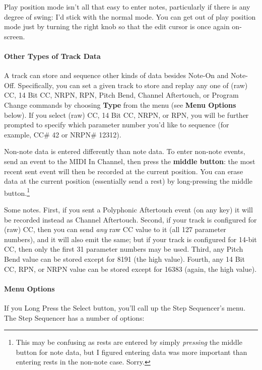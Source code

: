 \documentclass{article}
\begin{document}
Play position mode isn't all that easy to enter notes, particularly if there is any degree of swing: I'd stick with the normal mode.  You can get out of play position mode just by turning the right knob so that the edit cursor is once again on-screen.

\paragraph{Other Types of Track Data}  A track can store and sequence other kinds of data besides Note-On and Note-Off.  Specifically, you can set a given track to store and replay any one of (raw) CC, 14 Bit CC, NRPN, RPN, Pitch Bend, Channel Aftertouch, or Program Change commands by choosing {\bf Type} from the menu (see {\bf Menu Options} below).  If you select (raw) CC, 14 Bit CC, NRPN, or RPN, you will be further prompted to specify which parameter number you'd like to sequence (for example, CC\# 42 or NRPN\# 12312).

Non-note data is entered differently than note data.  To enter non-note events, send an event to the MIDI In Channel, then press the {\bf middle button}: the most recent sent event will then be recorded at the current position.  You can erase data at the current position (essentially send a rest) by long-pressing the middle button.\footnote{This may be confusing as rests are entered by simply {\it pressing} the middle button for note data, but I figured entering data was more important than entering rests in the non-note case.  Sorry.}

Some notes.  First, if you sent a Polyphonic Aftertouch event (on any key) it will be recorded instead as Channel Aftertouch.  Second, if your track is configured for (raw) CC, then you can send {\it any} raw CC value to it (all 127 parameter numbers), and it will also emit the same; but if your track is configured for 14-bit CC, then only the first 31 parameter numbers may be used.  Third, any Pitch Bend value can be stored except for 8191 (the high value).  Fourth, any 14 Bit CC, RPN, or NRPN value can be stored except for 16383 (again, the high value).  

\paragraph{Menu Options}

If you Long Press the Select button, you'll call up the Step Sequencer's menu.  The Step Sequencer has a number of options:
\end{document}
